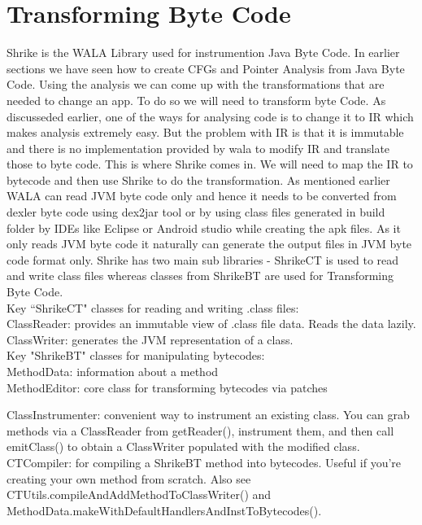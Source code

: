 \documentclass[11pt,psfig,a4]{article}
\begin{document}
\section{Transforming Byte Code}
\begin{flushleft}
Shrike is the WALA Library used for instrumention Java Byte Code. In earlier sections we have seen how to create CFGs and Pointer Analysis from Java Byte Code. Using the analysis we can come up with the transformations that are needed to change an app. To do so we will need to transform byte Code. As discusseded earlier, one of the ways for analysing code is to change it to IR which makes analysis extremely easy. But the problem with IR is that it is immutable and there is no implementation provided by wala to modify IR and translate those to byte code. This is where Shrike comes in. We will need to map the IR to bytecode and then use Shrike to do the transformation. As mentioned earlier WALA can read JVM byte code only and hence it needs to be converted from dexler byte code using dex2jar tool or by using class files generated in build folder by IDEs like Eclipse or Android studio while creating the apk files. As it only reads JVM byte code it naturally can generate the output files in JVM byte code format only. Shrike has two main sub libraries - ShrikeCT is used to read and write class files whereas classes from ShrikeBT are used for Transforming Byte Code.\\
\vspace{0.5em}
Key ``ShrikeCT" classes for reading and writing .class files:\\
\hspace{2em} ClassReader: provides an immutable view of .class file data. Reads the data lazily.\\
\hspace{2em} ClassWriter: generates the JVM representation of a class.\\
\vspace{0.5em}
Key "ShrikeBT" classes for manipulating bytecodes:\\
\hspace{2em} MethodData: information about a method\\
\hspace{2em} MethodEditor: core class for transforming bytecodes via patches\\
\begin{adjustwidth}{2.3em}{}
ClassInstrumenter: convenient way to instrument an existing class. You can grab methods via a ClassReader from getReader(), instrument them, and then call emitClass() to obtain a ClassWriter populated with the modified class.\\
CTCompiler: for compiling a ShrikeBT method into bytecodes. Useful if you're creating your own method from scratch. Also see CTUtils.compileAndAddMethodToClassWriter() and MethodData.makeWithDefaultHandlersAndInstToBytecodes().\\
\end{adjustwidth}

\end{flushleft}
\end{document}
